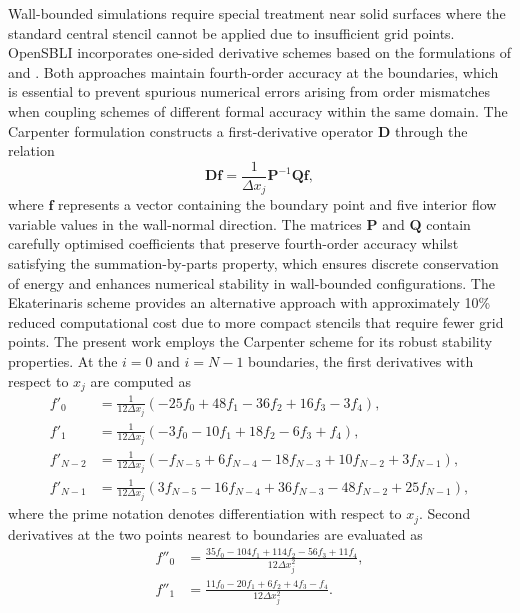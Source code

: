 Wall-bounded simulations require special treatment near solid surfaces where the standard central stencil cannot be applied due to insufficient grid points. OpenSBLI incorporates one-sided derivative schemes based on the formulations of \cite{CarpenterNordstromGottlieb1999} and \cite{Ekaterinaris2005}. Both approaches maintain fourth-order accuracy at the boundaries, which is essential to prevent spurious numerical errors arising from order mismatches when coupling schemes of different formal accuracy within the same domain. The Carpenter formulation constructs a first-derivative operator $\mathbf{D}$ through the relation
\begin{equation}
    \mathbf{D}\mathbf{f} = \frac{1}{\Delta x_j} \mathbf{P}^{-1} \mathbf{Q} \mathbf{f},
\end{equation}
where $\mathbf{f}$ represents a vector containing the boundary point and five interior flow variable values in the wall-normal direction. The matrices $\mathbf{P}$ and $\mathbf{Q}$ contain carefully optimised coefficients that preserve fourth-order accuracy whilst satisfying the summation-by-parts property, which ensures discrete conservation of energy and enhances numerical stability in wall-bounded configurations. The Ekaterinaris scheme provides an alternative approach with approximately 10\% reduced computational cost due to more compact stencils that require fewer grid points. The present work employs the Carpenter scheme for its robust stability properties. At the $i=0$ and $i=N-1$ boundaries, the first derivatives with respect to $x_j$ are computed as \begin{align}
    f'_0 &= \frac{1}{12\Delta x_j} \left(-25 f_0 + 48 f_1 - 36 f_2 + 16 f_3 - 3 f_4\right), \\[0.8em]
    f'_1 &= \frac{1}{12\Delta x_j} \left(-3 f_0 - 10 f_1 + 18 f_2 - 6 f_3 + f_4\right), \\[0.8em]
    f'_{N-2} &= \frac{1}{12\Delta x_j} \left(-f_{N-5} + 6 f_{N-4} - 18 f_{N-3} + 10 f_{N-2} + 3 f_{N-1}\right), \\[0.8em]
    f'_{N-1} &= \frac{1}{12\Delta x_j} \left(3 f_{N-5} - 16 f_{N-4} + 36 f_{N-3} - 48 f_{N-2} + 25 f_{N-1}\right),
\end{align}
where the prime notation denotes differentiation with respect to $x_j$. Second derivatives at the two points nearest to boundaries are evaluated as
\begin{align}
    f''_0 &= \frac{35 f_0 - 104 f_1 + 114 f_2 - 56 f_3 + 11 f_4}{12\Delta x_j^2}, \\[0.8em]
    f''_1 &= \frac{11 f_0 - 20 f_1 + 6 f_2 + 4 f_3 - f_4}{12\Delta x_j^2}.
\end{align}

